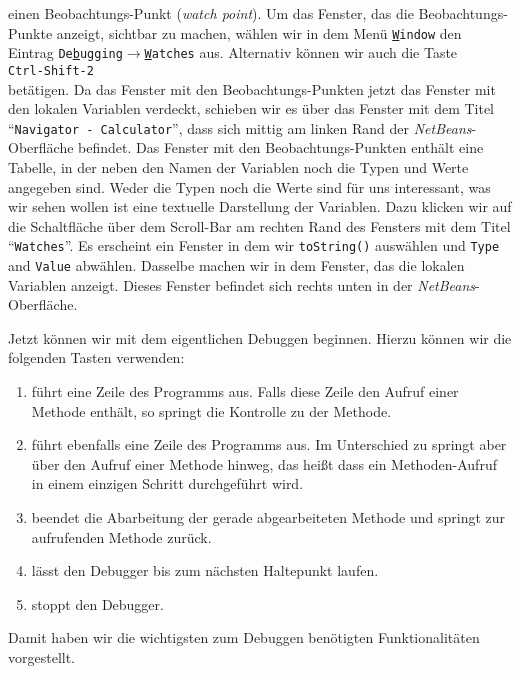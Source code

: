 \documentclass{article}
\begin{document}
einen Beobachtungs-Punkt (\emph{watch point}).
Um das Fenster, das die Beobachtungs-Punkte anzeigt, sichtbar zu machen, w\"ahlen wir in dem
Men\"u \texttt{\underline{W}indow} den Eintrag
\texttt{De\underline{b}ugging}$\rightarrow$\texttt{\underline{W}atches} aus.  Alternativ
k\"onnen wir auch die Taste \\[0.1cm]
\hspace*{1.3cm} \texttt{Ctrl-Shift-2} \\[0.1cm]
bet\"atigen.  Da das Fenster mit den Beobachtungs-Punkten jetzt das Fenster mit den lokalen
Variablen verdeckt, schieben wir es \"uber das Fenster mit dem Titel 
``\texttt{Navigator - Calculator}'', dass sich mittig am linken Rand der
\textsl{NetBeans}-Oberfl\"ache befindet.  Das Fenster mit den Beobachtungs-Punkten enth\"alt
eine Tabelle, in der neben den Namen der Variablen noch die Typen und Werte angegeben
sind.  Weder die Typen noch die Werte sind f\"ur uns interessant, was wir sehen wollen ist
eine textuelle Darstellung der Variablen.  Dazu klicken wir auf die Schaltfl\"ache \"uber dem
Scroll-Bar am rechten Rand des Fensters mit dem Titel ``\texttt{Watches}''.  Es erscheint ein Fenster in dem wir
\texttt{toString()} ausw\"ahlen und \texttt{Type} and \texttt{Value} abw\"ahlen.
Dasselbe machen wir in dem Fenster, das die lokalen
Variablen anzeigt.  Dieses Fenster befindet sich rechts unten in der
\textsl{NetBeans}-Oberfl\"ache.

Jetzt k\"onnen wir mit dem eigentlichen Debuggen beginnen.  Hierzu k\"onnen wir die folgenden
Tasten verwenden:
\begin{enumerate}
\item {} f\"uhrt eine Zeile des Programms aus.
      Falls diese Zeile den Aufruf einer Methode enth\"alt, so springt
      die Kontrolle zu der Methode.
\item {} f\"uhrt ebenfalls eine Zeile des Programms aus.
      Im Unterschied zu  springt 
      aber \"uber den  Aufruf einer Methode hinweg, das hei{\ss}t dass ein Methoden-Aufruf in
      einem einzigen Schritt durchgef\"uhrt wird.
\item {} beendet die Abarbeitung der gerade abgearbeiteten
      Methode und springt zur aufrufenden Methode zur\"uck.
\item {}  l\"asst den Debugger bis zum n\"achsten Haltepunkt laufen.
\item {} stoppt den Debugger.
\end{enumerate}
Damit haben wir die wichtigsten zum Debuggen ben\"otigten Funktionalit\"aten vorgestellt.
\end{document}
